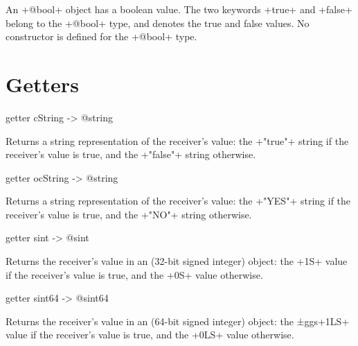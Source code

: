 

An \ggs+@bool+ object has a boolean value. The two keywords \ggs+true+ and \ggs+false+ belong to the \ggs+@bool+ type, and denotes the true and false values. No constructor is defined for the \ggs+@bool+ type.

\section{Getters}


\begin{galgascode}
getter cString -> @string
\end{galgascode}

Returns a string representation of the receiver's value: the \ggs+"true"+ string if the receiver's value is true, and the \ggs+"false"+ string otherwise.








\begin{galgascode}
getter ocString -> @string
\end{galgascode}

Returns a string representation of the receiver's value: the \ggs+"YES"+ string if the receiver's value is true, and the \ggs+"NO"+ string otherwise.





\begin{galgascode}
getter sint -> @sint
\end{galgascode}

Returns the receiver's value in an  (32-bit signed integer) object: the \ggs+1S+  value if the receiver's value is true, and the \ggs+0S+  value otherwise.





\begin{galgascode}
getter sint64 -> @sint64
\end{galgascode}

Returns the receiver's value in an  (64-bit signed integer) object: the ±ggs+1LS+  value if the receiver's value is true, and the \ggs+0LS+  value otherwise.




